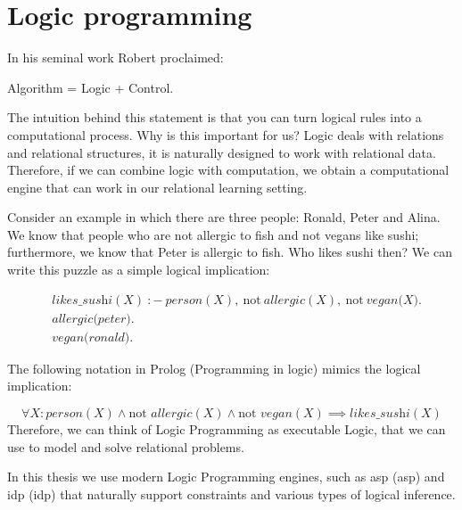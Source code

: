 \section{Logic programming}
In his seminal work Robert \textcite{kowalski} proclaimed:
\begin{center}
  Algorithm = Logic + Control.
\end{center}

The intuition behind this statement is that
you can turn logical rules into a computational process. 
Why is this important for us? Logic deals with
relations and relational structures, it is naturally designed to
work with relational data. Therefore, if we can combine logic
with computation, we obtain a computational engine that can work in
our relational learning setting.

Consider an example in which there are three people: Ronald, Peter and
Alina. We know that people who are not allergic to fish and not vegans like sushi; 
furthermore, we know that Peter is allergic to fish. 
Who likes sushi then? We can write this puzzle as a
simple logical implication:

\begin{equation*}
    \begin{aligned}
& \textit{likes\_sushi}(X)~{:}{-}~\textit{person}(X),~\text{not}~
        \textit{allergic}(X), ~\text{not}~\textit{vegan(X)}. \\
&       \textit{allergic(peter)}. \\
&       \textit{vegan(ronald)}.
    \end{aligned}
\end{equation*}

The following notation in Prolog (Programming in logic)
\parencite{prolog_original} mimics the logical implication:

\begin{equation}\label{eq:sushi}
  \forall X: \textit{person}(X) \wedge \text{not }
    \textit{allergic}(X) \wedge \text{not } \textit{vegan}(X)
  \implies \textit{likes\_sushi}(X)
\end{equation}
Therefore, we can think of Logic Programming as executable Logic, that
we can use to model and solve relational problems.

In this thesis we use modern Logic Programming engines, such
as \acrlong{asp} (\acrshort{asp}) \parencite{ASPbook,whatisasp} and
\acrlong{idp} (\acrshort{idp})
\parencite{idp} %
that naturally support constraints and various types of logical
inference.

